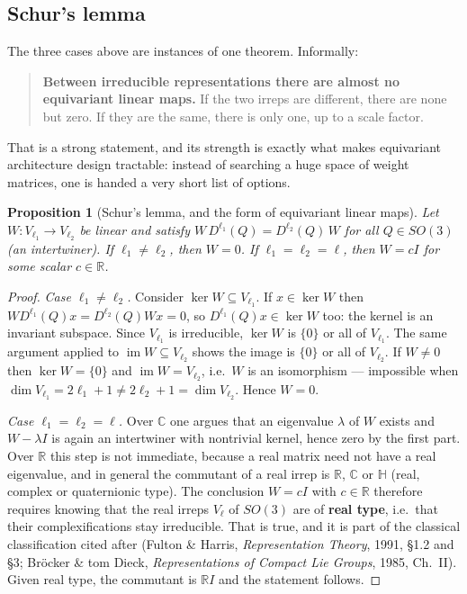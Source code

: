 \documentclass[11pt,a4paper]{report}
\newtheorem{proposition}[proposition]{Proposition}
\theoremstyle{definition}
\theoremstyle{remark}
\newcommand{\RR}{\mathbb R}
\newcommand{\CC}{\mathbb C}
\begin{document}
\subsection{Schur's lemma}
\label{sec:schur-proper}

The three cases above are instances of one theorem. Informally:

\begin{quote}
\textbf{Between irreducible representations there are almost no equivariant
linear maps.} If the two irreps are different, there are none but zero. If
they are the same, there is only one, up to a scale factor.
\end{quote}

That is a strong statement, and its strength is exactly what makes
equivariant architecture design tractable: instead of searching a huge space
of weight matrices, one is handed a very short list of options.

\begin{proposition}[Schur's lemma, and the form of equivariant linear maps]
\label{prop:schur-scratch}
Let $W:V_{\ell_1}\to V_{\ell_2}$ be linear and satisfy
$W\,D^{\ell_1}(Q) = D^{\ell_2}(Q)\,W$ for all $Q\in SO(3)$ (an
\emph{intertwiner}). If $\ell_1\ne\ell_2$, then $W=0$. If $\ell_1=\ell_2=\ell$,
then $W=cI$ for some scalar $c\in\RR$.
\end{proposition}

\begin{proof}
\emph{Case $\ell_1\neq\ell_2$.} Consider $\ker W\subseteq V_{\ell_1}$. If
$x\in\ker W$ then $W D^{\ell_1}(Q)x = D^{\ell_2}(Q)Wx = 0$, so
$D^{\ell_1}(Q)x\in\ker W$ too: the kernel is an invariant subspace. Since
$V_{\ell_1}$ is irreducible, $\ker W$ is $\{0\}$ or all of $V_{\ell_1}$. The
same argument applied to $\operatorname{im}W\subseteq V_{\ell_2}$ shows the
image is $\{0\}$ or all of $V_{\ell_2}$. If $W\ne0$ then $\ker W=\{0\}$ and
$\operatorname{im}W=V_{\ell_2}$, i.e.\ $W$ is an isomorphism --- impossible
when $\dim V_{\ell_1}=2\ell_1+1\neq2\ell_2+1=\dim V_{\ell_2}$. Hence $W=0$.

\emph{Case $\ell_1=\ell_2=\ell$.} Over $\CC$ one argues that an eigenvalue
$\lambda$ of $W$ exists and $W-\lambda I$ is again an intertwiner with
nontrivial kernel, hence zero by the first part. Over $\RR$ this step is not
immediate, because a real matrix need not have a real eigenvalue, and in
general the commutant of a real irrep is $\RR$, $\CC$ or $\mathbb H$
(real, complex or quaternionic type). The conclusion $W=cI$ with $c\in\RR$
therefore requires knowing that the real irreps $V_\ell$ of $SO(3)$ are of
\textbf{real type}, i.e.\ that their complexifications stay irreducible.
That is true, and it is part of the classical classification cited after
 (Fulton \& Harris,
\emph{Representation Theory}, 1991, \S1.2 and \S3; Br\"ocker \& tom Dieck,
\emph{Representations of Compact Lie Groups}, 1985, Ch.~II). Given real
type, the commutant is $\RR I$ and the statement follows.
\end{proof}
\end{document}
